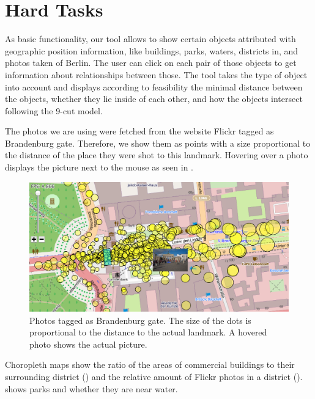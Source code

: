 \section*{Hard Tasks}
As basic functionality, our tool allows to show certain objects attributed with
geographic position information, like buildings, parks, waters, districts in, and
photos taken of Berlin.
The user can click on each pair of those objects to get information about
relationships between those.
The tool takes the type of object into account and displays according
to feasibility the minimal distance between the objects, whether they lie
inside of each other, and how the objects intersect following the 9-cut model.

The photos we are using were fetched from the website Flickr tagged
as Brandenburg gate.
Therefore, we show them as points with a size proportional to
the distance of the place they were shot to this landmark.
Hovering over a photo displays the picture next to the mouse
as seen in .

\begin{figure}[b]
\centering
\includegraphics[width=0.9\linewidth]{imgs/brand}
\caption{Photos tagged as Brandenburg gate. The size of the dots
is proportional to the distance to the actual landmark.
A hovered photo shows the actual picture.}
\label{fig:brandenburg}
\end{figure}

Choropleth maps show the ratio of the areas of commercial buildings to their surrounding
district () and the relative amount of
Flickr photos in a district ().
 shows parks and whether they are near water.

